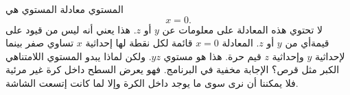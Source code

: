 \begin{surferPage}[مستوي]{المستوي}
معادلة المستوي هي \[x=0.\] لا تحتوي هذه المعادلة على معلومات عن $y$ أو $z$. هذا يعني أنه ليس من قيود على قيمةأي من $y$ أو $z$.
المعادلة $x=0$ قائمة لكل نقطة لها إحداثية $x$ تساوي صفر بينما لإحداثية $y$ وإحداثية $z$ قيم حرة. هذا هو مستوي $yz$.
\newline \newline
ولكن لماذا يبدو المستوي اللامتناهي الكبر مثل قرص؟ الإجابة مخفية في البرنامج. فهو يعرض السطح داخل كرة غير مرئية فلا يمكننا أن نرى سوى ما يوجد داخل الكرة وإلا لما كانت إتسعت الشاشة.
\end{surferPage}
